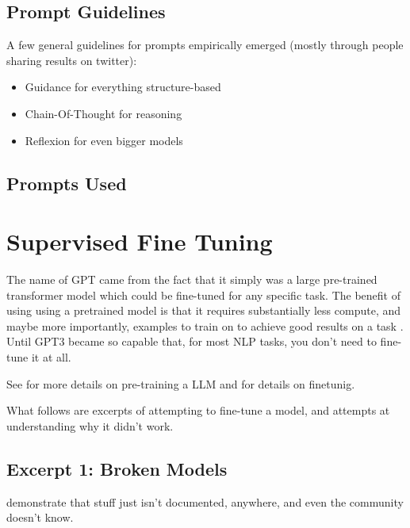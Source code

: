 \subsection{Prompt Guidelines}\label{sub:guidelines}
A few general guidelines for prompts empirically emerged (mostly through people sharing results on twitter):
\begin{itemize}
    \item Guidance for everything structure-based \cite{guidance_2023}
    \item Chain-Of-Thought for reasoning \cite{wei_chainofthought_2022}
    \item Reflexion for even bigger models \cite{shinn_reflexion_2023}
\end{itemize}

\subsection{Prompts Used}\label{sub:prompts}




\section{Supervised Fine Tuning}\label{sec:sft}
The name of \acrfull{GPT} came from the fact that it simply was a large pre-trained transformer model which could be fine-tuned for any specific task.
The benefit of using using a pretrained model is that it requires substantially less compute, and maybe more importantly, examples to train on to achieve good results on a task \cite{gaddipati_comparative_2020}.
Until \gls{GPT3} became so capable that, for most \gls{NLP} tasks, you don't need to fine-tune it at all.

See  for more details on pre-training a \gls{LLM} and  for details on finetunig.

What follows are excerpts of attempting to fine-tune a model, and attempts at understanding why it didn't work.

\subsection{Excerpt 1: Broken Models}\label{sub:brokenft}
demonstrate that stuff just isn't documented, anywhere, and even the community doesn't know.

